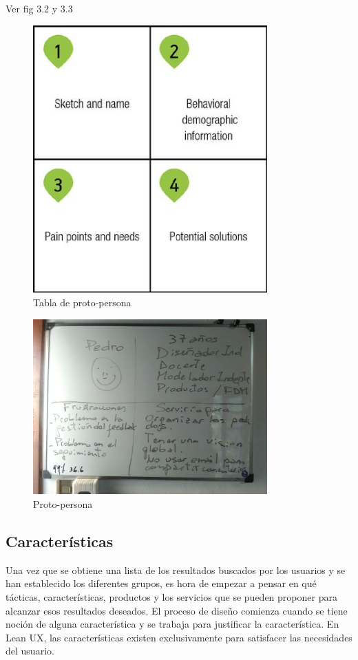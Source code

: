 Ver fig 3.2 y 3.3

\begin{figure}
\centering
\includegraphics[width=9cm]{Img/UX/proto-table.jpg}
\caption[Proto-persona (optional short caption)]{\label{us_figure} Tabla de proto-persona}
\end{figure}

\begin{figure}
\centering
\includegraphics[width=9cm]{Img/UX/UX-proto.jpg}
\caption[Proto-persona (optional short caption)]{\label{us_figure} Proto-persona}
\end{figure}

\subsection{Características}
 Una vez que se obtiene una lista de los resultados buscados por los usuarios y se han establecido los diferentes grupos, es hora de empezar a pensar en qué tácticas, características, productos y los servicios que se pueden proponer para alcanzar esos resultados deseados. El proceso de diseño comienza cuando se tiene noción de alguna característica y se trabaja para justificar la característica. En Lean UX, las características existen exclusivamente para satisfacer las necesidades del usuario.

